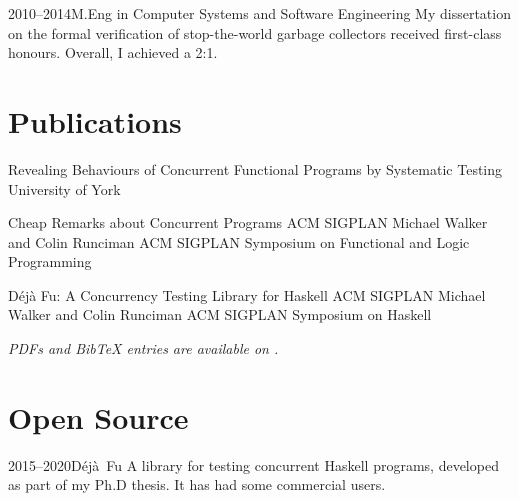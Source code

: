 \documentclass[a4paper]{barrucadu-cv}
\newcommand{\range}[2]{#1–#2}
\begin{document}
\begin{cventry}{\range{2010}{2014}}{M.Eng in Computer Systems and Software Engineering}
  My dissertation on the formal verification of stop-the-world garbage
  collectors received first-class honours.  Overall, I achieved a 2:1.
\end{cventry}

\section{Publications}

\def\entryheadinglevel{subsection}

  {Revealing Behaviours of Concurrent Functional Programs by Systematic Testing}
  {University of York}

  {Cheap Remarks about Concurrent Programs}
  {ACM SIGPLAN}
  {Michael Walker and Colin Runciman}
  {ACM SIGPLAN Symposium on Functional and Logic Programming}

  {Déjà Fu: A Concurrency Testing Library for Haskell}
  {ACM SIGPLAN}
  {Michael Walker and Colin Runciman}
  {ACM SIGPLAN Symposium on Haskell}

\textit{PDFs and BibTeX entries are available on .}

\section{Open Source}

\begin{cventry}{\range{2015}{2020}}{D\'{e}j\`{a}~Fu}
  A library for testing concurrent Haskell programs,
  developed as part of my Ph.D thesis. It has had some commercial users.

  \textbf{\small{}}
\end{cventry}
\end{document}
